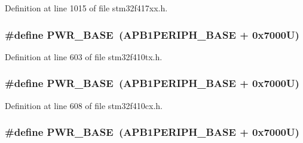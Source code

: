 Definition at line 1015 of file stm32f417xx.\+h.

\subsubsection[{\texorpdfstring{P\+W\+R\+\_\+\+B\+A\+SE}{PWR_BASE}}]{\setlength{\rightskip}{0pt plus 5cm}\#define P\+W\+R\+\_\+\+B\+A\+SE~({\bf A\+P\+B1\+P\+E\+R\+I\+P\+H\+\_\+\+B\+A\+SE} + 0x7000\+U)}\hypertarget{group___peripheral__registers__structures_gac691ec23dace8b7a649a25acb110217a}{}\label{group___peripheral__registers__structures_gac691ec23dace8b7a649a25acb110217a}


Definition at line 603 of file stm32f410tx.\+h.

\subsubsection[{\texorpdfstring{P\+W\+R\+\_\+\+B\+A\+SE}{PWR_BASE}}]{\setlength{\rightskip}{0pt plus 5cm}\#define P\+W\+R\+\_\+\+B\+A\+SE~({\bf A\+P\+B1\+P\+E\+R\+I\+P\+H\+\_\+\+B\+A\+SE} + 0x7000\+U)}\hypertarget{group___peripheral__registers__structures_gac691ec23dace8b7a649a25acb110217a}{}\label{group___peripheral__registers__structures_gac691ec23dace8b7a649a25acb110217a}


Definition at line 608 of file stm32f410cx.\+h.

\subsubsection[{\texorpdfstring{P\+W\+R\+\_\+\+B\+A\+SE}{PWR_BASE}}]{\setlength{\rightskip}{0pt plus 5cm}\#define P\+W\+R\+\_\+\+B\+A\+SE~({\bf A\+P\+B1\+P\+E\+R\+I\+P\+H\+\_\+\+B\+A\+SE} + 0x7000\+U)}\hypertarget{group___peripheral__registers__structures_gac691ec23dace8b7a649a25acb110217a}{}\label{group___peripheral__registers__structures_gac691ec23dace8b7a649a25acb110217a}


